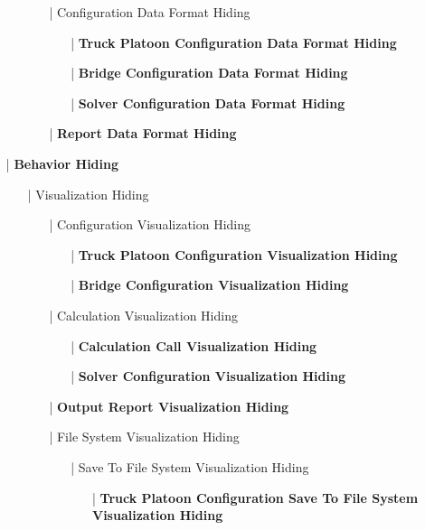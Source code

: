 \documentclass[12pt, titlepage]{article}
\begin{document}
\begin{enumerate}
\begin{enumerate}
        \begin{enumerate}
            \item[|] Configuration Data Format Hiding
            \begin{itemize}
                \item[|] \textbf{Truck Platoon Configuration Data Format Hiding}
                \item[|] \textbf{Bridge Configuration Data Format Hiding}
                \item[|] \textbf{Solver Configuration Data Format Hiding}
            \end{itemize}
            \item[|] \textbf{Report Data Format Hiding}
        \end{enumerate}
    \end{enumerate}
    \item[|] \textbf{Behavior Hiding}
    \begin{enumerate}
        \item[|] Visualization Hiding
        \begin{enumerate}
            \item[|] Configuration Visualization Hiding
            \begin{itemize}
                \item[|] \textbf{Truck Platoon Configuration Visualization Hiding}
                \item[|] \textbf{Bridge Configuration Visualization Hiding}
            \end{itemize}
            \item[|] Calculation Visualization Hiding
            \begin{itemize}
                \item[|] \textbf{Calculation Call Visualization Hiding}
                \item[|] \textbf{Solver Configuration Visualization Hiding}
            \end{itemize}
            \item[|] \textbf{Output Report Visualization Hiding}
            \item[|] File System Visualization Hiding
            \begin{itemize}
                \item[|] {Save To File System Visualization Hiding}
                \begin{itemize}
                    \item[|] \textbf{Truck Platoon Configuration Save To File System Visualization Hiding}

\end{itemize}
\end{itemize}
\end{enumerate}
\end{enumerate}
\end{enumerate}
\end{document}

